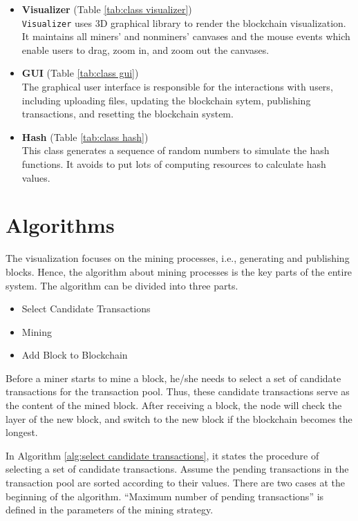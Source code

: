 \begin{itemize}
    \item \textbf{Visualizer} (Table \ref{tab:class visualizer}) \\
        \texttt{Visualizer} uses 3D graphical library to render the blockchain visualization. It maintains all miners' and nonminers' canvases and the mouse events which enable users to drag, zoom in, and zoom out the canvases.
    \item \textbf{GUI} (Table \ref{tab:class gui}) \\
        The graphical user interface is responsible for the interactions with users, including uploading files, updating the blockchain sytem, publishing transactions, and resetting the blockchain system.
    \item \textbf{Hash} (Table \ref{tab:class hash}) \\
        This class generates a sequence of random numbers to simulate the hash functions. It avoids to put lots of computing resources to calculate hash values.
\end{itemize}

\section{Algorithms}
\label{algorithms}

The visualization focuses on the mining processes, i.e., generating and publishing blocks. Hence, the algorithm about mining processes is the key parts of the entire system. The algorithm can be divided into three parts.

\begin{itemize}
    \item Select Candidate Transactions
    \item Mining
    \item Add Block to Blockchain
\end{itemize}

Before a miner starts to mine a block, he/she needs to select a set of candidate transactions for the transaction pool. Thus, these candidate transactions serve as the content of the mined block. After receiving a block, the node will check the layer of the new block, and switch to the new block if the blockchain becomes the longest.

In Algorithm \ref{alg:select candidate transactions}, it states the procedure of selecting a set of candidate transactions. Assume the pending transactions in the transaction pool are sorted according to their values. There are two cases at the beginning of the algorithm. ``Maximum number of pending transactions'' is defined in the parameters of the mining strategy.

